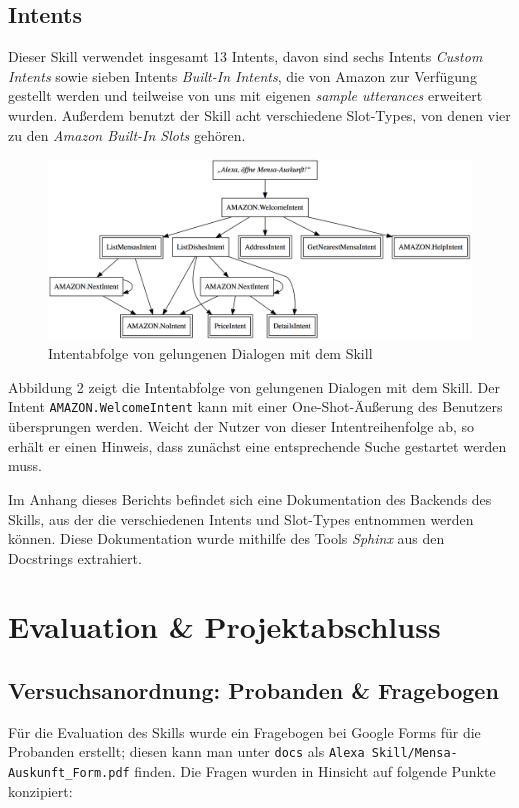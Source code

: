 \documentclass[12pt]{article}
\begin{document}
\subsection{Intents}
Dieser Skill verwendet insgesamt 13 Intents, davon sind sechs Intents \emph{Custom Intents} sowie sieben Intents \emph{Built-In Intents}, die von Amazon zur Verfügung gestellt werden und teilweise von uns mit eigenen \emph{sample utterances} erweitert wurden. 
Außerdem benutzt der Skill acht verschiedene Slot-Types, von denen vier zu den \emph{Amazon Built-In Slots} gehören.

\begin{figure}[ht]
\center
\includegraphics[width=\textwidth]{intent-order.png}
\caption{Intentabfolge von gelungenen Dialogen mit dem Skill}
\end{figure}

Abbildung 2 zeigt die Intentabfolge von gelungenen Dialogen mit dem Skill.
Der Intent \texttt{AMAZON.WelcomeIntent} kann mit einer One-Shot-Äußerung des Benutzers übersprungen werden.
Weicht der Nutzer von dieser Intentreihenfolge ab, so erhält er einen Hinweis, dass zunächst eine entsprechende Suche gestartet werden muss.

Im Anhang dieses Berichts befindet sich eine Dokumentation des Backends des Skills, aus der die verschiedenen Intents und Slot-Types entnommen werden können.
Diese Dokumentation wurde mithilfe des Tools \emph{Sphinx} aus den Docstrings extrahiert.

\section{Evaluation \& Projektabschluss}
\subsection{Versuchsanordnung: Probanden \& Fragebogen}
Für die Evaluation des Skills wurde ein Fragebogen bei Google Forms für die Probanden erstellt; diesen kann man unter \texttt{docs} als \texttt{Alexa Skill/Mensa-Auskunft\_Form.pdf} finden. Die Fragen wurden in Hinsicht auf folgende Punkte konzipiert:
\end{document}
